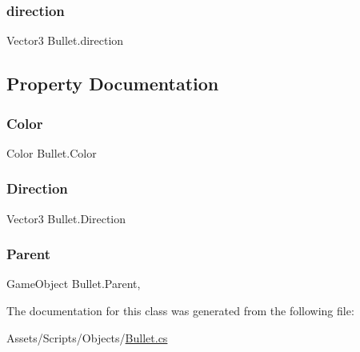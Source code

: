 \subsubsection{\texorpdfstring{direction}{direction}}
{\footnotesize\ttfamily Vector3 Bullet.\+direction}



\subsection{Property Documentation}
\mbox{\label{class_bullet_a11c93a49641814a887a9275cf5f927b2}} 
\subsubsection{\texorpdfstring{Color}{Color}}
{\footnotesize\ttfamily Color Bullet.\+Color\hspace{0.3cm}{\ttfamily [set]}}

\mbox{\label{class_bullet_a5c72494550e4c1b0afc815a3a10679d9}} 
\subsubsection{\texorpdfstring{Direction}{Direction}}
{\footnotesize\ttfamily Vector3 Bullet.\+Direction\hspace{0.3cm}{\ttfamily [set]}}

\mbox{\label{class_bullet_ac42f67adee20458b6c1d1e3a50c37324}} 
\subsubsection{\texorpdfstring{Parent}{Parent}}
{\footnotesize\ttfamily Game\+Object Bullet.\+Parent\hspace{0.3cm}{\ttfamily [get]}, {\ttfamily [set]}}



The documentation for this class was generated from the following file\+:\begin{DoxyCompactItemize}
\item 
Assets/\+Scripts/\+Objects/\mbox{\hyperlink{_bullet_8cs}{Bullet.\+cs}}\end{DoxyCompactItemize}

